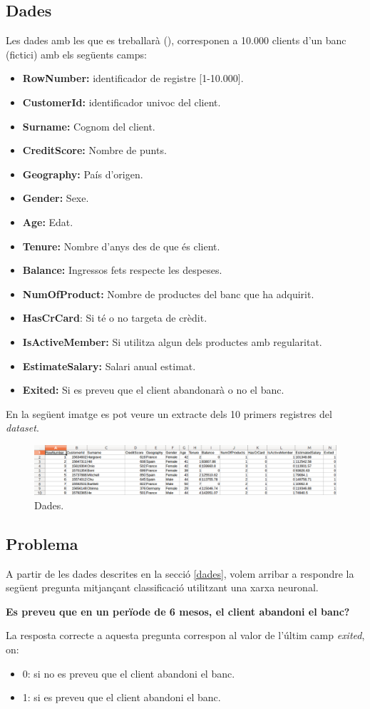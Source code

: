 \documentclass[12pt]{article}
\begin{document}
\subsection{Dades\label{dades}}
Les dades amb les que es treballarà (), corresponen a 10.000 clients d'un banc (fictici) amb els següents camps:
\begin{itemize}
	\item \textbf{RowNumber:} identificador de registre [1-10.000].
	\item \textbf{CustomerId:} identificador univoc del client.
	\item \textbf{Surname:} Cognom del client.
	\item \textbf{CreditScore:} Nombre de punts.
	\item \textbf{Geography:} País d'origen.
	\item \textbf{Gender:} Sexe.
	\item \textbf{Age:} Edat.
	\item \textbf{Tenure:} Nombre d'anys des de que és client.
	\item \textbf{Balance:} Ingressos fets respecte les despeses.
	\item \textbf{NumOfProduct:} Nombre de productes del banc que ha adquirit.
	\item \textbf{HasCrCard}: Si té o no targeta de crèdit.
	\item \textbf{IsActiveMember:} Si utilitza algun dels productes amb regularitat.
	\item \textbf{EstimateSalary:} Salari anual estimat.
	\item \textbf{Exited:} Si es preveu que el client abandonarà o no el banc.
\end{itemize}
En la següent imatge es pot veure un extracte dels 10 primers registres del \textit{dataset}.
\pagebreak
\begin{figure}[h!]
	\centering
	\includegraphics[scale=0.4]{imatges/dades/dades.png}
	\caption{Dades.}
\end{figure}

\clearpage
\subsection{Problema}
A partir de les dades descrites en la secció \ref{dades}, volem arribar a respondre la següent pregunta mitjançant classificació utilitzant una xarxa neuronal.
\begin{center}
\textbf{Es preveu que en un perïode de 6 mesos, el client abandoni el banc?}
\end{center}
La resposta correcte a aquesta pregunta correspon al valor de l'últim camp \textit{exited}, on:
\begin{itemize}
	\item 0: si no es preveu que el client abandoni el banc.
	\item 1: si es preveu que el client abandoni el banc.
\end{itemize}
\end{document}
